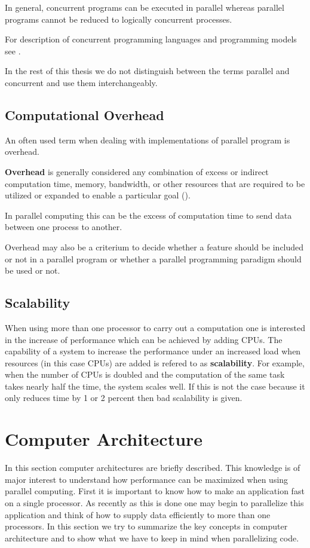 In general, concurrent programs can be executed 
in parallel whereas parallel programs cannot be reduced to logically
concurrent processes. 

For description of concurrent programming languages and programming
models see \cite{gehani88:concurrentprog}.

In the rest of this thesis we do not distinguish between the terms
parallel and concurrent and use them interchangeably.

\subsection{Computational Overhead}

An often used term when dealing with implementations of parallel
program is overhead.

\textbf{Overhead} is generally considered any combination of excess or indirect
computation time, memory, bandwidth, or other
resources that are required to be utilized or expanded to enable a
particular goal (\cite{wiki:overhead}).

In parallel computing this can be the excess of computation time to
send data between one process to another.

Overhead may also be a criterium to decide whether a feature should be
included or not in a parallel program or whether a parallel
programming paradigm should be used or not.

\subsection{Scalability}

When using more than one processor to carry out a computation one is
interested in the increase of performance which can be achieved by
adding CPUs. The capability of a system to increase the performance
under an increased load when resources (in this case CPUs) are added
is refered to as \textbf{scalability}. For example, when the number of
CPUs is doubled and the computation of the same task takes nearly half
the time, the 
system scales well. If this is not the case because it only reduces
time by 1 or 2 percent then bad scalability is given. 

\section{Computer Architecture}

In this section computer architectures are briefly described. This
knowledge is of major interest to
understand how performance can be maximized when using parallel
computing. First it is important to know how to make an application fast
on a single processor. As recently as this is done one may begin to
parallelize this application and think of how to supply data efficiently to
more than one processors. In this section we try to summarize the key
concepts in computer architecture and to show what we have to keep in
mind when parallelizing code.

